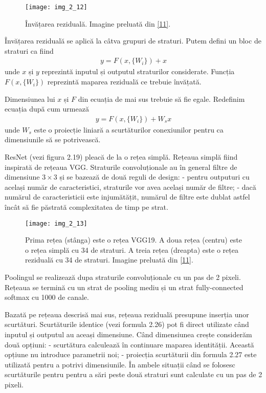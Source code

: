 \begin{figure}[!h]
	\centering
	\texttt{[image: img\_2\_12]}
	\caption[Învățarea reziduală]{Învățarea reziduală. Imagine preluată din \hyperlink{KaimingHeXiangyuZhangShaoqingRenJianSun}{[11]}.}
\end{figure}  

Învățarea reziduală se aplică la câtva grupuri de straturi. Putem defini un bloc de straturi ca fiind 
\begin{align}
	y = F(x,\{W_i\}) + x
\end{align}
unde $x$ și $y$ reprezintă inputul și outputul straturilor considerate. Funcția $F(x, \{W_i\})$ reprezintă maparea reziduală ce trebuie învățată.

Dimensiunea lui $x$ și $F$ din ecuația de mai sus trebuie să fie egale. Redefinim ecuația după cum urmează
\begin{align}
	y = F(x,\{W_i\}) + W_sx
\end{align}
unde $W_s$ este o proiecție liniară a scurtăturilor conexiunilor pentru ca dimensiunile să se potrivească.

ResNet (vezi figura 2.19) pleacă de la o rețea simplă. Rețeaua simplă fiind inspirată de rețeaua VGG. Straturile convoluționale au în general filtre de dimensiune $3 \times 3$ și se bazează de două reguli de design: - pentru outputuri cu același număr de caracteristici, straturile vor avea același număr de filtre; - dacă numărul de caracteristicii este injumătățit, numărul de filtre este dublat astfel încât să fie păstrată complexitatea de timp pe strat.

\begin{figure}[!h]
	\centering
	\texttt{[image: img\_2\_13]}
	\caption[Rețeaua ResNet]{Prima rețea (stânga) este o rețea VGG19. A doua rețea (centru) este o rețea simplă cu 34 de straturi. A treia rețea (dreapta) este o rețea reziduală cu 34 de straturi. Imagine preluată din \hyperlink{KaimingHeXiangyuZhangShaoqingRenJianSun}{[11]}.}
\end{figure} 

Poolingul se realizează dupa straturile convoluționale cu un pas de 2 pixeli. Rețeaua se termină cu un strat de pooling mediu și un strat fully-connected softmax cu 1000 de canale.

Bazată pe rețeaua descrisă mai sus, rețeaua reziduală presupune inserția unor scurtături. Scurtăturile identice (vezi formula 2.26) pot fi direct utilizate când inputul și outputul au aceași dimensiune. Când dimensiunea crește considerăm două opțiuni: - scurtătura calculează în continuare maparea identității. Această opțiune nu introduce parametrii noi; - proiecția scurtăturii din formula 2.27 este utilizată pentru a potrivi dimensiunile. În ambele situații când se folosesc scurtăturile pentru pentru a sări peste două straturi sunt calculate cu un pas de 2 pixeli. 

